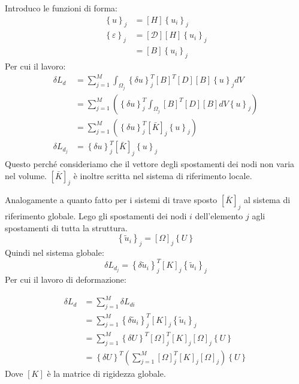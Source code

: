 Introduco le funzioni di forma:
\begin{align*}
 \left\{ u\right\}_j&= [H]\left\{u_i\right\}_j\\
 \left\{ \varepsilon\right\}_j&= [\mathcal{D}] [H]\left\{u_i\right\}_j\\
 &= [B]\left\{u_i\right\}_j
\end{align*}
Per cui il lavoro:
\begin{align*}
 \delta L_{d} &= \sum^M_{j=1} \int_{\Omega_j}     \left\{\delta u\right\}_j^T  [B]^T  [D]  [B]  \left\{ u\right\}_j dV\\
 &= \sum^M_{j=1}\left( \left\{\delta u\right\}_j^T \int_{\Omega_j}      [B]^T  [D]  [B]  dV    \left\{ u\right\}_j  \right)\\
 &= \sum^M_{j=1}\left( \left\{\delta u\right\}_j^T       [\bar{K}]_j      \left\{ u\right\}_j  \right)\\
 \delta L_{d_j} &= \left\{\delta u\right\}_j^T       [\bar{K}]_j      \left\{ u\right\}_j 
\end{align*}
Questo perché consideriamo che il vettore degli spostamenti dei nodi non varia nel volume. $ [\bar{K}]_j  $ è inoltre scritta nel sistema di riferimento locale.

Analogamente a quanto fatto per i sistemi di trave sposto $ [\bar{K}]_j  $ al sistema di riferimento globale. Lego gli spostamenti dei nodi $i$ dell'elemento $j$ agli spostamenti di tutta la struttura.
\begin{equation*}
  \left\{ \tilde{u}_i\right\}_j =   [\Omega]_j  \left\{ U\right\} 
\end{equation*}
Quindi nel sistema globale:
\begin{equation*}
 \delta L_{d_j} = \left\{\delta \tilde{u}_i\right\}_j^T       [K]_j      \left\{ \tilde{u}_i\right\}_j 
\end{equation*}
Per cui il lavoro di deformazione:

\begin{align*}
        \delta L_d  &=\sum_{j=1}^M \delta L_{di} \\
        &= \sum_{j=1}^M    \left\{\delta \tilde{u}_i\right\}_j^T       [K]_j      \left\{ \tilde{u}_i\right\}_j    \\
          &= \sum_{j=1}^M  \left\{ \delta  U\right\} ^T   [\Omega]_j^T   [K]_j     [\Omega]_j  \left\{ U\right\}\\
          &=   \left\{ \delta  U\right\}^T   \left( \sum_{j=1}^M   [\Omega]_j^T   [K]_j     [\Omega]_j   \right)\left\{ U\right\}
    \end{align*}
    Dove $[K] $ è la matrice di rigidezza globale.

